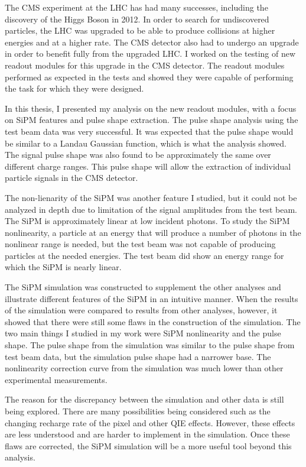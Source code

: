 The CMS experiment at the LHC has had many successes, including the discovery of the Higgs Boson in 2012. In order to search for undiscovered particles, the LHC was upgraded to be able to produce collisions at higher energies and at a higher rate. The CMS detector also had to undergo an upgrade in order to benefit fully from the upgraded LHC. I worked on the testing of new readout modules for this upgrade in the CMS detector. The readout modules performed as expected in the tests and showed they were capable of performing the task for which they were designed. 

In this thesis, I presented my analysis on the new readout modules, with a focus on SiPM features and pulse shape extraction. The pulse shape analysis using the test beam data was very successful. It was expected that the pulse shape would be similar to a Landau Gaussian function, which is what the analysis showed. The signal pulse shape was also found to be approximately the same over different charge ranges. This pulse shape will allow the extraction of individual particle signals in the CMS detector. 

The non-lienarity of the SiPM was another feature I studied, but it could not be analyzed in depth due to limitation of the signal amplitudes from the test beam. The SiPM is approximately linear at low incident photons. To study the SiPM nonlinearity, a particle at an energy that will produce a number of photons in the nonlinear range is needed, but the test beam was not capable of producing particles at the needed energies. The test beam did show an energy range for which the SiPM is nearly linear.

The SiPM simulation was constructed to supplement the other analyses and illustrate different features of the SiPM in an intuitive manner. When the results of the simulation were compared to results from other analyses, however, it showed that there were still some flaws in the construction of the simulation. The two main things I studied in my work were SiPM nonlinearity and the pulse shape. The pulse shape from the simulation was similar to the pulse shape from test beam data, but the simulation pulse shape had a narrower base. The nonlinearity correction curve from the simulation was much lower than other experimental measurements.

The reason for the discrepancy between the simulation and other data is still being explored. There are many possibilities being considered such as the changing recharge rate of the pixel and other QIE effects. However, these effects are less understood and are harder to implement in the simulation. Once these flaws are corrected, the SiPM simulation will be a more useful tool beyond this analysis. 

